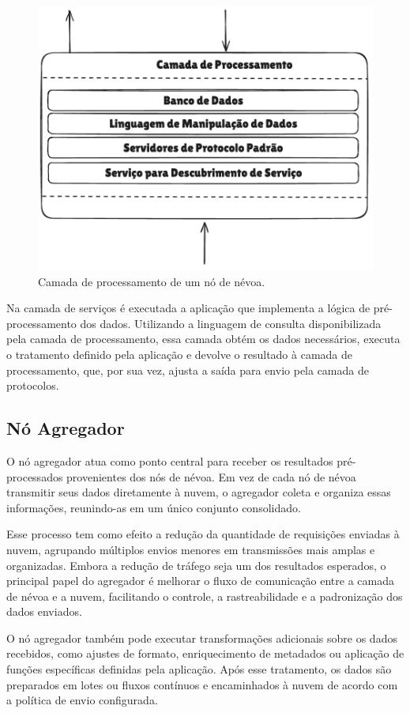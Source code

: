 \begin{figure}[htb]
    \caption{\label{fig:camada_processamento}Camada de processamento de um nó de névoa.}
    \begin{center}
        \includegraphics[width=0.7\linewidth]{images/camada_processamento.png}
    \end{center}
\end{figure}

Na camada de serviços é executada a aplicação que implementa a lógica de pré-processamento dos dados. Utilizando a linguagem de consulta disponibilizada pela camada de processamento, essa camada obtém os dados necessários, executa o tratamento definido pela aplicação e devolve o resultado à camada de processamento, que, por sua vez, ajusta a saída para envio pela camada de protocolos.

\subsection{Nó Agregador}

O nó agregador atua como ponto central para receber os resultados pré-processados provenientes dos nós de névoa. Em vez de cada nó de névoa transmitir seus dados diretamente à nuvem, o agregador coleta e organiza essas informações, reunindo-as em um único conjunto consolidado.

Esse processo tem como efeito a redução da quantidade de requisições enviadas à nuvem, agrupando múltiplos envios menores em transmissões mais amplas e organizadas. Embora a redução de tráfego seja um dos resultados esperados, o principal papel do agregador é melhorar o fluxo de comunicação entre a camada de névoa e a nuvem, facilitando o controle, a rastreabilidade e a padronização dos dados enviados.

O nó agregador também pode executar transformações adicionais sobre os dados recebidos, como ajustes de formato, enriquecimento de metadados ou aplicação de funções específicas definidas pela aplicação. Após esse tratamento, os dados são preparados em lotes ou fluxos contínuos e encaminhados à nuvem de acordo com a política de envio configurada.
